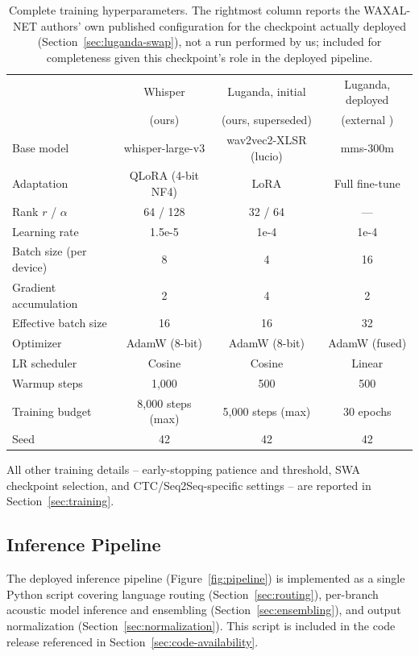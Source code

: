 \documentclass[11pt]{article}
\begin{document}
\begin{table}[htbp]
\centering
\caption{Complete training hyperparameters. The rightmost column reports the WAXAL-NET authors' own published configuration \cite{waxalbenchmarking2026mms300mlug} for the checkpoint actually deployed (Section~\ref{sec:luganda-swap}), not a run performed by us; included for completeness given this checkpoint's role in the deployed pipeline.}
\label{tab:hyperparams}
\begin{tabular}{lccc}
\toprule
 & Whisper & Luganda, initial & Luganda, deployed \\
 & (ours) & (ours, superseded) & (external \cite{waxalbenchmarking2026mms300mlug}) \\
\midrule
Base model & whisper-large-v3 & wav2vec2-XLSR (lucio) & mms-300m \\
Adaptation & QLoRA (4-bit NF4) & LoRA & Full fine-tune \\
Rank $r$ / $\alpha$ & 64 / 128 & 32 / 64 & --- \\
Learning rate & 1.5e-5 & 1e-4 & 1e-4 \\
Batch size (per device) & 8 & 4 & 16 \\
Gradient accumulation & 2 & 4 & 2 \\
Effective batch size & 16 & 16 & 32 \\
Optimizer & AdamW (8-bit) & AdamW (8-bit) & AdamW (fused) \\
LR scheduler & Cosine & Cosine & Linear \\
Warmup steps & 1{,}000 & 500 & 500 \\
Training budget & 8{,}000 steps (max) & 5{,}000 steps (max) & 30 epochs \\
Seed & 42 & 42 & 42 \\
\bottomrule
\end{tabular}
\end{table}

All other training details -- early-stopping patience and threshold, SWA checkpoint selection, and CTC/Seq2Seq-specific settings -- are reported in Section~\ref{sec:training}.

\subsection{Inference Pipeline}

The deployed inference pipeline (Figure~\ref{fig:pipeline}) is implemented as a single Python script covering language routing (Section~\ref{sec:routing}), per-branch acoustic model inference and ensembling (Section~\ref{sec:ensembling}), and output normalization (Section~\ref{sec:normalization}). This script is included in the code release referenced in Section~\ref{sec:code-availability}.
\end{document}
